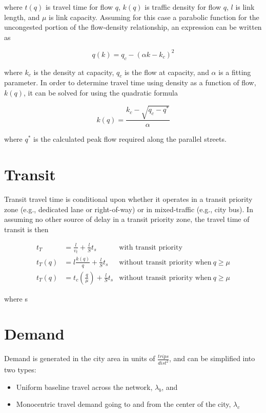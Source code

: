 \documentclass{article}
\begin{document}
\noindent where $t(q)$ is travel time for flow $q$, $k(q)$ is traffic density for flow $q$, $l$ is link length, and $\mu$ is link capacity. Assuming for this case a parabolic function for the uncongested portion of the flow-density relationship, an expression can be written as

\begin{equation}
    q(k) = q_c - (\alpha k - k_c)^2
\end{equation}

\noindent where $k_c$ is the density at capacity, $q_c$ is the flow at capacity, and $\alpha$ is a fitting parameter. In order to determine travel time using density as a function of flow, $k(q)$, it can be solved for using the quadratic formula

\begin{equation}
    k(q) = \frac{k_c - \sqrt{q_c - q^*}}{\alpha}
\end{equation}

\noindent where $q^*$ is the calculated peak flow required along the parallel streets.

\section{Transit}

Transit travel time is conditional upon whether it operates in a transit priority zone (e.g., dedicated lane or right-of-way) or in mixed-traffic (e.g., city bus). In assuming no other source of delay in a transit priority zone, the travel time of transit is then

\begin{align}
    t_T & = \frac{l}{v_{t}} + \frac{l}{S}t_s  & \text{with transit priority} \\
    t_T(q) & = l\frac{k(q)}{q} + \frac{l}{S}t_s  & \text{without transit priority when}~q \geq \mu\\
    t_T(q) & = t_c (\frac{q}{\mu}) + \frac{l}{S}t_s & \text{without transit priority when}~q \geq \mu
\end{align}

\noindent where s



\section{Demand}
Demand is generated in the city area in units of $\frac{trips}{dist^2}$, and can be simplified into two types: 

\begin{itemize}[topsep=3pt, itemsep=3pt, partopsep=3pt, parsep=3pt]
    \item Uniform baseline travel across the network, $\lambda_b$, and
    \item Monocentric travel demand going to and from the center of the city, $\lambda_c$
\end{itemize}
\end{document}
